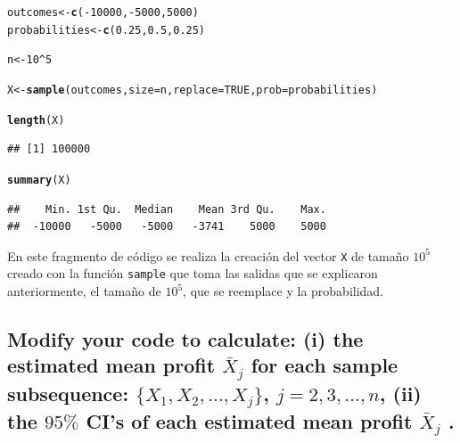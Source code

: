 \documentclass[12pt]{article}\usepackage[]{graphicx}\usepackage[]{xcolor}
\makeatletter
\newcommand{\hlnum}[1]{\textcolor[rgb]{0.686,0.059,0.569}{#1}}%
\newcommand{\hlopt}[1]{\textcolor[rgb]{0,0,0}{#1}}%
\newcommand{\hldef}[1]{\textcolor[rgb]{0.345,0.345,0.345}{#1}}%
\newcommand{\hlkwb}[1]{\textcolor[rgb]{0.69,0.353,0.396}{#1}}%
\newcommand{\hlkwc}[1]{\textcolor[rgb]{0.333,0.667,0.333}{#1}}%
\newcommand{\hlkwd}[1]{\textcolor[rgb]{0.737,0.353,0.396}{\textbf{#1}}}%
\newenvironment{kframe}{%
 \def\at@end@of@kframe{}%
 \ifinner\ifhmode%
  \def\at@end@of@kframe{\end{minipage}}%
  \begin{minipage}{\columnwidth}%
 \fi\fi%
 \def\FrameCommand##1{\hskip\@totalleftmargin \hskip-\fboxsep
 \colorbox{shadecolor}{##1}\hskip-\fboxsep
     \hskip-\linewidth \hskip-\@totalleftmargin \hskip\columnwidth}%
 \MakeFramed {\advance\hsize-\width
   \@totalleftmargin\z@ \linewidth\hsize
   \@setminipage}}%
 {\par\unskip\endMakeFramed%
 \at@end@of@kframe}
\newenvironment{knitrout}{}{} %
\makeatother
\begin{document}
\begin{knitrout}
\color{fgcolor}\begin{kframe}
\begin{alltt}
\hldef{outcomes} \hlkwb{<-} \hlkwd{c}\hldef{(}\hlopt{-}\hlnum{10000}\hldef{,} \hlopt{-}\hlnum{5000}\hldef{,} \hlnum{5000}\hldef{)}
\hldef{probabilities} \hlkwb{<-} \hlkwd{c}\hldef{(}\hlnum{0.25}\hldef{,} \hlnum{0.5}\hldef{,} \hlnum{0.25}\hldef{)}

\hldef{n} \hlkwb{<-} \hlnum{10}\hlopt{^}\hlnum{5}

\hldef{X} \hlkwb{<-} \hlkwd{sample}\hldef{(outcomes,} \hlkwc{size} \hldef{= n ,} \hlkwc{replace} \hldef{=} \hlnum{TRUE}\hldef{,} \hlkwc{prob} \hldef{= probabilities)}

\hlkwd{length}\hldef{(X)}
\end{alltt}
\begin{verbatim}
## [1] 100000
\end{verbatim}
\begin{alltt}
\hlkwd{summary}\hldef{(X)}
\end{alltt}
\begin{verbatim}
##    Min. 1st Qu.  Median    Mean 3rd Qu.    Max. 
##  -10000   -5000   -5000   -3741    5000    5000
\end{verbatim}
\end{kframe}
\end{knitrout}

En este fragmento de código se realiza la creación del vector \lstinline|X| de tamaño $10^{5}$ creado con la función \lstinline|sample| que toma las salidas que se explicaron anteriormente, el tamaño de $10^{5}$, que se reemplace y la probabilidad.


\subsection{Modify your code to calculate: (i) the estimated mean profit $\bar{X}_{j}$ for each sample subsequence: $\{X_{1}, X_{2}, . . . , X_{j} \}$, $j = 2, 3, \dots, n$, (ii) the $95 \%$ CI’s of each estimated mean profit $\bar{X}_{j}$ .}
\end{document}
